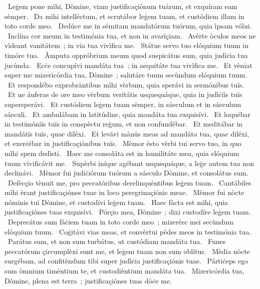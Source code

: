 {~Leġem pone mìhi, Dòmine, viam justificaçiónum tuárum, et exquíram eam sèmper. 
~Da mìhi intelléctum, et scrutábor leġem tuam, et custódiem illam in toto corde meo. 
~Dedúce me in sémitam mandatórum tuórum, quia ìpsam vólui. 
~Inclína cor meum in testimónia tua, et non in avarìçiam. 
~Avèrte òculos meos ne vìdeant vanitátem~; in via tua vivìfica me. 
~Státue servo tuo elóquium tuum in timóre tuo. 
~Àmputa oppróbrium meum quod suspicátus sum, quia judìċia tua jucùnda. 
~Ecċe concupívi mandáta tua~; in aequitáte tua vivìfica me. 
~Et vèniat super me mizericórdia tua, Dòmine~; salutáre tuum secùndum elóquium tuum. 
~Et respondébo exprobràntibus mìhi vèrbum, quia sperávi in sermónibus tuïs. 
~Et ne áuferas de ore meo vèrbum veritátis usquequáque, quia in judìċiïs tuïs supersperávi. 
~Et custódiem leġem tuam sèmper, in sáeculum et in sáeculum sáeculi. 
~Et ambulábam in latitúdine, quia mandáta tua exquisívi. 
~Et loquébar in testimóniïs tuïs in conspèctu reġum, et non confundébar. 
~Et meditábar in mandátïs tuïs, quae diléxi. 
~Et levávi mànüs meas ad mandáta tua, quae diléxi, et exerċébar in justificaçiónibus tuïs. 
~Mèmor èsto vèrbi tui servo tuo, in quo mìhi spem dedìsti. 
~Haec me consoláta est in humilitáte mea, quia elóquium tuum vivificávit me. 
~Supèrbi iníque agébant usquequáque, a leġe autem tua non declinávi. 
~Mèmor fui judiċiórum tuórum a sáeculo Dòmine, et consolátus sum. 
~Defècçio tènuit me, pro peccatóribus derelinquèntibus leġem tuam. 
~Cantábiles mìhi èrant justificaçiónes tuae in loco peregrinaçiónis meae. 
~Mèmor fui nòcte nóminis tui Dòmine, et custodívi leġem tuam. 
~Haec fàcta est mìhi, quia justificaçiónes tuas exquisívi. 
~Pórçio mea, Dòmine~; dixi custodíre leġem tuam. 
~Deprecátus sum fàċiem tuam in toto corde meo~; mizerére mei secùndum elóquium tuum. 
~Coġitávi vias meas, et convèrtui pèdes meos in testimónia tua. 
~Parátus sum, et non sum turbátus, ut custódiam mandáta tua. 
~Funes peccatórum çircumplèxi sunt me, et leġem tuam non sum oblítus. 
~Mèdia nòcte surgébam, ad confitèndum tìbi super judìċia justificaçiónis tuae. 
~Pártiċeps ego sum òmnium timèntium te, et custodièntium mandáta tua. 
~Mizericórdia tua, Dòmine, plena est terra~; justificaçiónes tuas dòċe me. 
}
